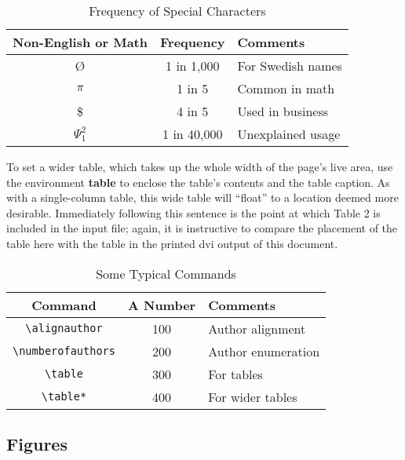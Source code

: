 \documentclass{acm_proc_article-sp}
\begin{document}
\begin{table}[htb]
\caption{Frequency of Special Characters} 
\begin{center}
\begin{tabular}{|c|c|l|}
\hline
 Non-English or Math  &  Frequency    &  Comments           \\
\hline
 \O                   &  1 in 1,000   &  For Swedish names  \\
\hline
 $\pi$                &  1 in 5       &  Common in math     \\
\hline
 \$                   &  4 in 5       &  Used in business   \\
\hline
 $\Psi^2_1$           &  1 in 40,000  &  Unexplained usage  \\
\hline
\end{tabular}
\end{center}
\end{table}


To set a wider table, which takes up the whole width of the page's
live area, use the environment \textbf{table\*} to enclose the table's
contents and the table caption.  As with a single-column table, this
wide table will ``float'' to a location deemed more desirable.
Immediately following this sentence is the point at which Table 2 is
included in the input file; again, it is instructive to compare the
placement of the table here with the table in the printed dvi output
of this document.




\begin{table*}[htb]
\caption{Some Typical Commands} 
\begin{center}
\begin{tabular}{|c|c|l|}
\hline
 Command                                   &  A Number  &  Comments            \\
\hline
 \texttt{\textbackslash{}alignauthor}      &       100  &  Author alignment    \\
\hline
 \texttt{\textbackslash{}numberofauthors}  &       200  &  Author enumeration  \\
\hline
 \texttt{\textbackslash{}table}            &       300  &  For tables          \\
\hline
 \texttt{\textbackslash{}table*}           &       400  &  For wider tables    \\
\hline
\end{tabular}
\end{center}
\end{table*}
\subsection{Figures}
\label{sec-3-5}
\end{document}
